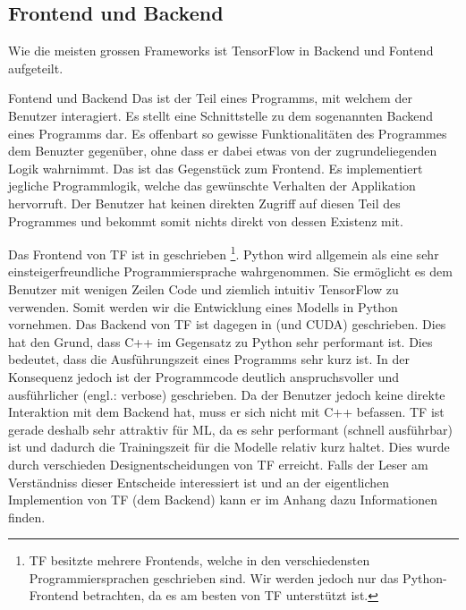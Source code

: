 \subsection{Frontend und Backend}
Wie die meisten grossen Frameworks ist TensorFlow in Backend und
Fontend aufgeteilt.
\para{}
\begin{infobox}{Fontend und Backend}
  Das  ist der Teil eines Programms, mit welchem der Benutzer
  interagiert. Es stellt eine Schnittstelle zu dem sogenannten Backend eines
  Programms dar. Es offenbart so gewisse Funktionalitäten des Programmes dem
  Benuzter gegenüber, ohne dass er dabei etwas von der zugrundeliegenden Logik wahrnimmt.
  \para{}
  Das  ist das Gegenstück zum Frontend. Es implementiert
  jegliche Programmlogik, welche das gewünschte Verhalten der Applikation
  hervorruft. Der Benutzer hat keinen direkten Zugriff auf diesen Teil des
  Programmes und bekommt somit nichts direkt von dessen Existenz mit.
\end{infobox}
\para{}
Das Frontend von TF ist in  geschrieben%
\footnote{
  TF besitzte mehrere Frontends, welche in den verschiedensten
  Programmiersprachen geschrieben sind. Wir werden jedoch nur das
  Python-Frontend betrachten, da es am besten von TF unterstützt ist.
}.
Python wird allgemein als eine sehr einsteigerfreundliche Programmiersprache wahrgenommen. Sie
ermöglicht es dem Benutzer mit wenigen Zeilen Code und ziemlich intuitiv
TensorFlow zu verwenden. Somit werden wir die Entwicklung eines Modells in
Python vornehmen.
\para{}
Das Backend von TF ist dagegen in  (und CUDA)
geschrieben. Dies hat den Grund, dass C++ im Gegensatz zu Python sehr performant
ist. Dies bedeutet, dass die Ausführungszeit eines Programms sehr kurz ist. In
der Konsequenz jedoch ist der Programmcode deutlich anspruchsvoller und
ausführlicher (engl.: verbose) geschrieben.
Da der Benutzer jedoch keine direkte Interaktion mit dem Backend hat, muss er
sich nicht mit C++ befassen.
\para{}
TF ist gerade deshalb sehr attraktiv für ML, da es sehr performant (schnell
ausführbar) ist und dadurch die Trainingszeit für die Modelle relativ
kurz haltet. Dies wurde durch verschieden Designentscheidungen von TF erreicht.
Falls der Leser am Verständniss dieser Entscheide interessiert ist und an der
eigentlichen Implemention von TF (dem Backend) kann er im Anhang  dazu
Informationen finden.

